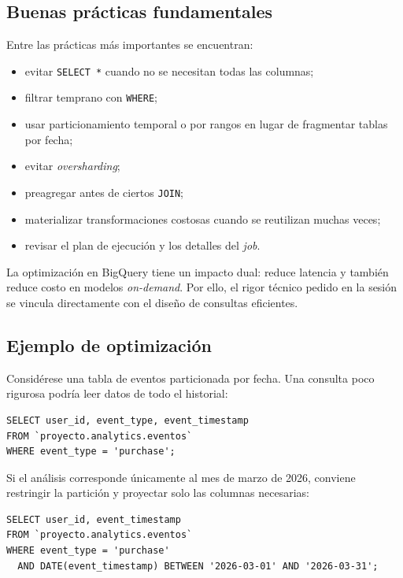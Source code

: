 \documentclass[12pt]{article}
\begin{document}
\subsection{Buenas prácticas fundamentales}
Entre las prácticas más importantes se encuentran:

\begin{itemize}[leftmargin=*]
\item evitar \texttt{SELECT *} cuando no se necesitan todas las columnas;
\item filtrar temprano con \texttt{WHERE};
\item usar particionamiento temporal o por rangos en lugar de fragmentar tablas por fecha;
\item evitar \textit{oversharding};
\item preagregar antes de ciertos \texttt{JOIN};
\item materializar transformaciones costosas cuando se reutilizan muchas veces;
\item revisar el plan de ejecución y los detalles del \textit{job}.
\end{itemize}

La optimización en BigQuery tiene un impacto dual: reduce latencia y también reduce costo en modelos \textit{on-demand}. Por ello, el rigor técnico pedido en la sesión se vincula directamente con el diseño de consultas eficientes.

\subsection{Ejemplo de optimización}
Considérese una tabla de eventos particionada por fecha. Una consulta poco rigurosa podría leer datos de todo el historial:

\begin{lstlisting}[style=sql, caption={Consulta poco eficiente}]
SELECT user_id, event_type, event_timestamp
FROM `proyecto.analytics.eventos`
WHERE event_type = 'purchase';
\end{lstlisting}

Si el análisis corresponde únicamente al mes de marzo de 2026, conviene restringir la partición y proyectar solo las columnas necesarias:

\begin{lstlisting}[style=sql, caption={Consulta optimizada con filtro y proyección}]
SELECT user_id, event_timestamp
FROM `proyecto.analytics.eventos`
WHERE event_type = 'purchase'
  AND DATE(event_timestamp) BETWEEN '2026-03-01' AND '2026-03-31';
\end{lstlisting}
\end{document}
